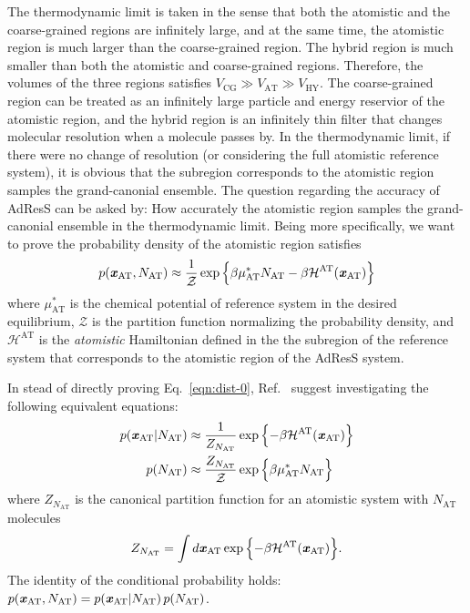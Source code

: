 \documentclass[epjST]{svjour}
\newcommand{\vect}[1]{\textbf{\textit{#1}}}
\newcommand{\mh}[0]{\mathcal {H}}
\newcommand{\AT}[0]{\textrm{AT}}
\newcommand{\HY}[0]{\textrm{HY}}
\newcommand{\CG}[0]{\textrm{CG}}
\begin{document}
The thermodynamic limit is taken in the sense that both the atomistic
and the coarse-grained regions are infinitely large, and at the same
time, the atomistic region is much larger than the coarse-grained
region. The hybrid region is much smaller than both the atomistic and
coarse-grained regions.  Therefore, the volumes of the
three regions satisfies $V_\CG\gg V_\AT\gg V_\HY$.  The coarse-grained
region can be treated as an infinitely large particle and energy
reservior of the atomistic region, and the hybrid region is an
infinitely thin filter that changes molecular resolution when a
molecule passes by. In the
thermodynamic limit, if there were no change of resolution (or
considering the full atomistic reference system), it is obvious that
the subregion corresponds to the atomistic region samples the
grand-canonial ensemble.  The question regarding the accuracy of
AdResS can be asked by: How accurately the atomistic region samples
the grand-canonial ensemble in the thermodynamic limit. Being more
specifically, we want to prove the probability density of the atomistic region satisfies
\begin{align}\label{eqn:dist-0}
  p(\vect x_\AT, N_\AT) \approx \frac{1}{\mathcal Z} \exp\Big\{{\beta\mu^\ast_\AT N_\AT - \beta \mh^\AT(\vect x_\AT)} \Big\}
\end{align}
where $\mu^\ast_\AT$ is the chemical potential of reference system in
the desired equilibrium, $\mathcal Z$ is the partition function
normalizing the probability density, and $\mh^\AT$ is the \emph{atomistic}
Hamiltonian defined in the the subregion of the reference system that
corresponds to the atomistic region of the AdResS system.

In stead of directly proving Eq.~\eqref{eqn:dist-0}, Ref.~\cite{wang2013grand}
suggest investigating the following equivalent equations:
\begin{align}\label{eqn:dist-1-0}
  p(\vect x_\AT \vert N_\AT) &\approx \frac{1}{Z_{N_\AT}} \exp\Big\{{- \beta \mh^\AT(\vect x_\AT)}\Big\}  \\\label{eqn:dist-1-1}
  p(N_\AT) & \approx \frac{ Z_{N_\AT}}{\mathcal Z} \exp\Big\{{\beta\mu^\ast_\AT N_\AT}\Big\}
\end{align}
where $Z_{N_\AT}$ is the canonical partition function for an atomistic
system with $N_\AT$ molecules
\begin{align}
  Z_{N_\AT} = \int d\vect x_{\AT} \exp\Big\{{- \beta \mh^\AT(\vect x_\AT)}\Big\}.
\end{align}
The identity of the conditional probability holds: $ p(\vect x_\AT, N_\AT)  = p(\vect x_\AT \vert N_\AT) \, p(N_\AT) $.
\end{document}
